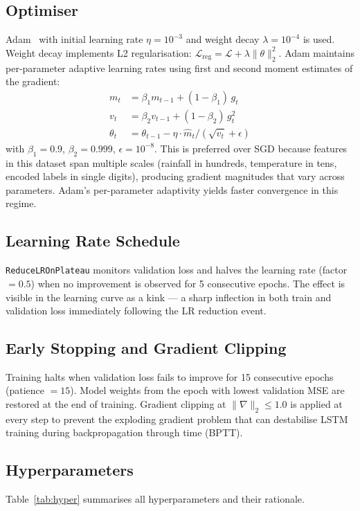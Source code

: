 \documentclass[conference]{IEEEtran}
\begin{document}
\subsection{Optimiser}
Adam~\cite{kingma2014} with initial learning rate $\eta = 10^{-3}$ and weight decay
$\lambda = 10^{-4}$ is used.
Weight decay implements L2 regularisation:
$\mathcal{L}_{\text{reg}} = \mathcal{L} + \lambda \|\theta\|_2^2$.
Adam maintains per-parameter adaptive learning rates using first and second moment
estimates of the gradient:
\begin{align}
    m_t &= \beta_1 m_{t-1} + (1-\beta_1)\,g_t \\
    v_t &= \beta_2 v_{t-1} + (1-\beta_2)\,g_t^2 \\
    \theta_t &= \theta_{t-1} - \eta \cdot \hat{m}_t / (\sqrt{\hat{v}_t} + \epsilon)
\end{align}
with $\beta_1{=}0.9$, $\beta_2{=}0.999$, $\epsilon{=}10^{-8}$.
This is preferred over SGD because features in this dataset span multiple scales
(rainfall in hundreds, temperature in tens, encoded labels in single digits),
producing gradient magnitudes that vary across parameters.
Adam's per-parameter adaptivity yields faster convergence in this regime.

\subsection{Learning Rate Schedule}
\texttt{ReduceLROnPlateau} monitors validation loss and halves the learning rate
(factor $= 0.5$) when no improvement is observed for 5 consecutive epochs.
The effect is visible in the learning curve as a kink — a sharp inflection in both
train and validation loss immediately following the LR reduction event.

\subsection{Early Stopping and Gradient Clipping}
Training halts when validation loss fails to improve for 15 consecutive epochs
(patience $= 15$).
Model weights from the epoch with lowest validation MSE are restored at the end
of training.
Gradient clipping at $\|\nabla\|_2 \leq 1.0$ is applied at every step to prevent
the exploding gradient problem that can destabilise LSTM training during
backpropagation through time (BPTT).

\subsection{Hyperparameters}
Table~\ref{tab:hyper} summarises all hyperparameters and their rationale.
\end{document}
